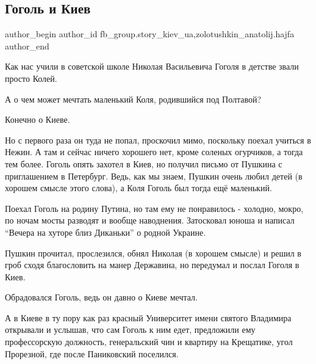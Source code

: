  
 
 
 
 
 
\subsection{Гоголь и Киев}
\label{sec:28_09_2021.fb.fb_group.story_kiev_ua.1.gogol_i_kiev}
 
\ifcmt
 author_begin
   author_id fb_group.story_kiev_ua,zolotushkin_anatolij.hajfa
 author_end
\fi

Как нас учили в советской школе Николая Васильевича Гоголя в детстве звали
просто Колей.

А о чем может мечтать маленький Коля, родившийся под Полтавой?

Конечно о Киеве.

Но с первого раза он туда не попал, проскочил мимо, поскольку поехал учиться в
Нежин. А там и сейчас ничего хорошего нет, кроме соленых огурчиков, а тогда тем
более. Гоголь опять захотел в Киев, но получил письмо от Пушкина с приглашением
в Петербург. Ведь, как мы знаем, Пушкин очень любил детей (в хорошем смысле
этого слова), а Коля Гоголь был тогда ещё маленький. 

Поехал Гоголь на родину Путина, но там ему не понравилось - холодно, мокро, по
ночам мосты разводят и вообще наводнения. Затосковал юноша  и написал \enquote{Вечера
на хуторе близ Диканьки} о родной Украине. 

Пушкин прочитал, прослезился, обнял Николая (в хорошем смысле) и решил в гроб
сходя благословить на манер Державина, но передумал и послал Гоголя в   Киев.

Обрадовался Гоголь, ведь он давно о Киеве мечтал.

А в Киеве в ту пору как раз красный Университет имени святого Владимира
открывали и услышав, что сам Гоголь к ним едет, предложили ему профессорскую
должность, генеральский чин и квартиру на Крещатике, угол Прорезной, где после
Паниковский поселился.

